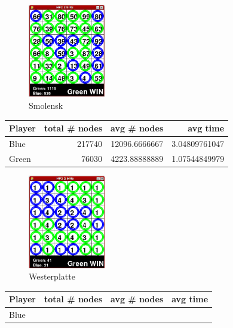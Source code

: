 \begin{multicols*}{2}
\begin{figure}[H]
\centering
\includegraphics[width=0.3\textwidth]{graphics/ma_smolensk.png}
\caption{Smolensk}
\end{figure}
\begin{tabular}{l|r|r|r}
  Player & total \# nodes & avg \# nodes & avg time \\
  \hline
  Blue & 217740 & 12096.6666667 & 3.04809761047 \\
  Green & 76030 & 4223.88888889 & 1.07544849979 \\
\end{tabular}

\begin{figure}[H]
\centering
\includegraphics[width=0.3\textwidth]{graphics/ma_westerplatte.png}
\caption{Westerplatte}
\end{figure}
\begin{tabular}{l|r|r|r}
  Player & total \# nodes & avg \# nodes & avg time \\
  \hline
  Blue & 
\end{tabular}


\end{multicols*}
